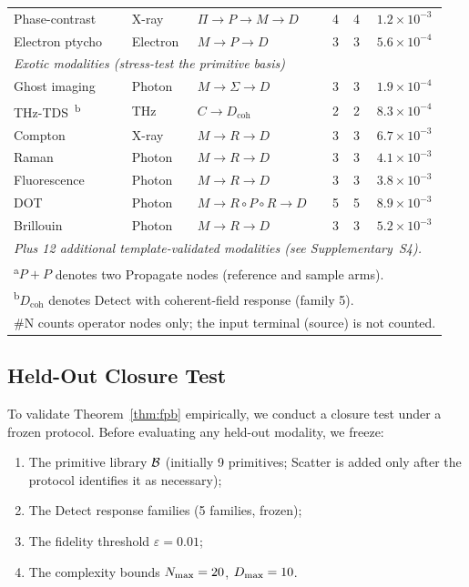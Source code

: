 \documentclass[11pt]{article}
\begin{document}
\begin{longtable}{l l l c c c}
Phase-contrast~\cite{pfeiffer2008xray}  & X-ray       & $\Pi \to P \to M \to D$       & 4 & 4 & $1.2 \times 10^{-3}$ \\
Electron ptycho~\cite{jiang2018electron} & Electron    & $M \to P \to D$               & 3 & 3 & $5.6 \times 10^{-4}$ \\
\midrule
\multicolumn{6}{l}{\textit{Exotic modalities (stress-test the primitive basis)}} \\
Ghost imaging~\cite{pittman1995ghost}   & Photon      & $M \to \Sigma \to D$          & 3 & 3 & $1.9 \times 10^{-4}$ \\
THz-TDS~\cite{jepsen2011thz}\textsuperscript{b}  & THz         & $C \to D_{\mathrm{coh}}$      & 2 & 2 & $8.3 \times 10^{-4}$ \\
Compton~\cite{hussain2022compton}         & X-ray       & $M \to R \to D$               & 3 & 3 & $6.7 \times 10^{-3}$ \\
Raman~\cite{long2002raman}           & Photon      & $M \to R \to D$               & 3 & 3 & $4.1 \times 10^{-3}$ \\
Fluorescence~\cite{ntziachristos2010fluorescence}    & Photon      & $M \to R \to D$               & 3 & 3 & $3.8 \times 10^{-3}$ \\
DOT~\cite{arridge1999dot}             & Photon      & $M \to R \circ P \circ R \to D$ & 5 & 5 & $8.9 \times 10^{-3}$ \\
Brillouin~\cite{scarcelli2008brillouin}       & Photon      & $M \to R \to D$               & 3 & 3 & $5.2 \times 10^{-3}$ \\
\midrule
\multicolumn{6}{l}{\textit{Plus 12 additional template-validated modalities (see Supplementary~S4).}} \\
\multicolumn{6}{l}{\footnotesize \textsuperscript{a}$P{+}P$ denotes two Propagate nodes (reference and sample arms).} \\
\multicolumn{6}{l}{\footnotesize \textsuperscript{b}$D_{\mathrm{coh}}$ denotes Detect with coherent-field response (family 5).} \\
\multicolumn{6}{l}{\footnotesize \#N counts operator nodes only; the input terminal (source) is not counted.} \\
\end{longtable}

\subsection{Held-Out Closure Test}

To validate Theorem~\ref{thm:fpb} empirically, we conduct a closure test under a frozen protocol. Before evaluating any held-out modality, we freeze:
\begin{enumerate}
  \item The primitive library $\mathcal{B}$ (initially 9 primitives; Scatter is added only after the protocol identifies it as necessary);
  \item The Detect response families (5 families, frozen);
  \item The fidelity threshold $\varepsilon = 0.01$;
  \item The complexity bounds $N_{\max} = 20$, $D_{\max} = 10$.
\end{enumerate}
\end{document}
